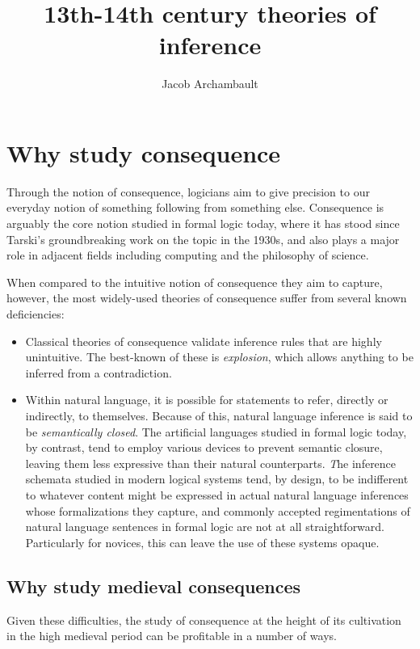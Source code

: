 \documentclass[]{article}
\title{13th-14th century theories of inference}
\author{Jacob Archambault}
\begin{document}
\maketitle

\section{Why study consequence}
Through the notion of consequence, 
logicians aim to give precision to our everyday notion of something following from something else. 
Consequence is arguably the core notion studied in formal logic today, 
where it has stood since Tarski's groundbreaking work on the topic in the 1930s, 
and also plays a major role in adjacent fields including computing and the philosophy of science. 

When compared to the intuitive notion of consequence they aim to capture, 
however, 
the most widely-used theories of consequence suffer from several known deficiencies: 
\begin{itemize}
	\item Classical theories of consequence validate inference rules that are highly unintuitive. 
	The best-known of these is \emph{explosion}, 
	which allows anything to be inferred from a contradiction.
	\item Within natural language, 
	it is possible for statements to refer, 
	directly or indirectly, 
	to themselves. 
	Because of this, 
	natural language inference is said to be \emph{semantically closed}. 
	The artificial languages studied in formal logic today, 
	by contrast, 
	tend to employ various devices to prevent semantic closure, 
	leaving them less expressive than their natural counterparts.
	\emph The inference schemata studied in modern logical systems tend, 
	by design, 
	to be indifferent to whatever content might be expressed in actual natural language inferences whose formalizations they capture, 
	and commonly accepted regimentations of natural language sentences in formal logic are not at all straightforward. 
	Particularly for novices, this can leave the use of these systems opaque. 
\end{itemize}

\subsection{Why study medieval consequences}
Given these difficulties, 
the study of consequence at the height of its cultivation in the high medieval period can be profitable in a number of ways. 
\end{document}
